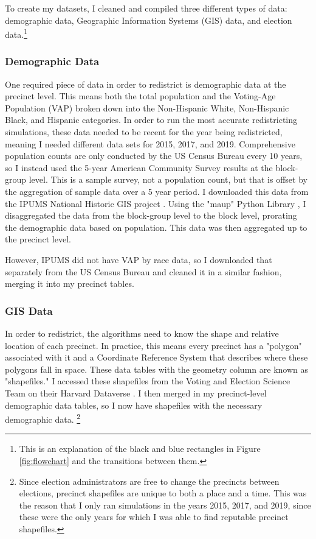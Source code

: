 To create my datasets, I cleaned and compiled three different types of data: demographic data, Geographic Information Systems (GIS) data, and election data.\footnote{This is an explanation of the black and blue rectangles in Figure \ref{fig:flowchart} and the transitions between them.} 

\subsubsection{Demographic Data}

One required piece of data in order to redistrict is demographic data at the precinct level. This means both the total population and the Voting-Age Population (VAP) broken down into the Non-Hispanic White, Non-Hispanic Black, and Hispanic categories. In order to run the most accurate redistricting simulations, these data needed to be recent for the year being redistricted, meaning I needed different data sets for 2015, 2017, and 2019. Comprehensive population counts are only conducted by the US Census Bureau every 10 years, so I instead used the 5-year American Community Survey results at the block-group level. This is a sample survey, not a population count, but that is offset by the aggregation of sample data over a 5 year period. I downloaded this data from the IPUMS National Historic GIS project \parencite{mansonsteven2020}. Using the "maup" Python Library \parencite{hully}, I disaggregated the data from the block-group level to the block level, prorating the demographic data based on population. This data was then aggregated up to the precinct level.

However, IPUMS did not have VAP by race data, so I downloaded that separately from the US Census Bureau \parencite{uscensusbureau} and cleaned it in a similar fashion, merging it into my precinct tables. 

\subsubsection{GIS Data}

In order to redistrict, the algorithms need to know the shape and relative location of each precinct. In practice, this means every precinct has a "polygon" associated with it and a Coordinate Reference System that describes where these polygons fall in space. These data tables with the geometry column are known as "shapefiles." I accessed these shapefiles from the Voting and Election Science Team on their Harvard Dataverse \parencite{votingandelectionscienceteam2019a,votingandelectionscienceteam2019,votingandelectionscienceteam2019b}. I then merged in my precinct-level demographic data tables, so I now have shapefiles with the necessary demographic data. \footnote{Since election administrators are free to change the precincts between elections, precinct shapefiles are unique to both a place and a time. This was the reason that I only ran simulations in the years 2015, 2017, and 2019, since these were the only years for which I was able to find reputable precinct shapefiles.}

